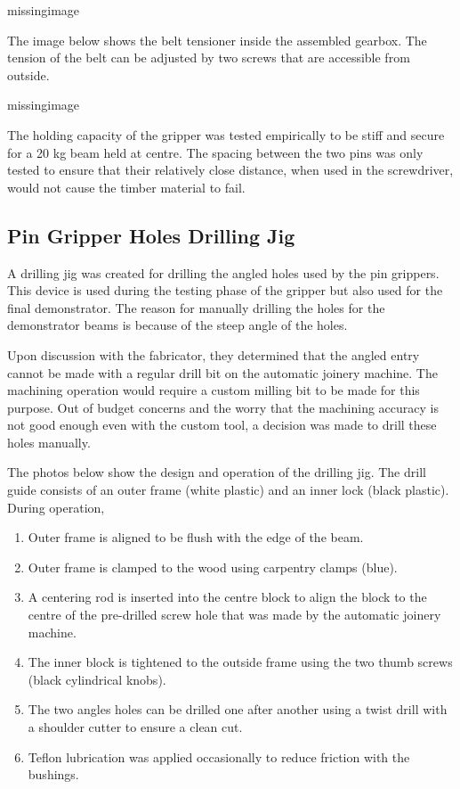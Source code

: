 missingimage

The image below shows the belt tensioner inside the assembled gearbox. The tension of the belt can be adjusted by two screws that are accessible from outside.

missingimage

The holding capacity of the gripper was tested empirically to be stiff and secure for a 20 kg beam held at centre. The spacing between the two pins was only tested to ensure that their relatively close distance, when used in the screwdriver, would not cause the timber material to fail. 

\subsection{Pin Gripper Holes Drilling Jig}
A drilling jig was created for drilling the angled holes used by the pin grippers. This device is used during the testing phase of the gripper but also used for the final demonstrator. The reason for manually drilling the holes for the demonstrator beams is because of the steep angle of the holes. 

Upon discussion with the fabricator, they determined that the angled entry cannot be made with a regular drill bit on the automatic joinery machine. The machining operation would require a custom milling bit to be made for this purpose. Out of budget concerns and the worry that the machining accuracy is not good enough even with the custom tool, a decision was made to drill these holes manually.

The photos below show the design and operation of the drilling jig. The drill guide consists of an outer frame (white plastic) and an inner lock (black plastic). During operation, 

\begin{enumerate}
    \item Outer frame is aligned to be flush with the edge of the beam.
    \item Outer frame is clamped to the wood using carpentry clamps (blue).
    \item A centering rod is inserted into the centre block to align the block to the centre of the pre-drilled screw hole that was made by the automatic joinery machine.
    \item The inner block is tightened to the outside frame using the two thumb screws (black cylindrical knobs).
    \item The two angles holes can be drilled one after another using a twist drill with a shoulder cutter to ensure a clean cut.
    \item Teflon lubrication was applied occasionally to reduce friction with the bushings.
\end{enumerate}

